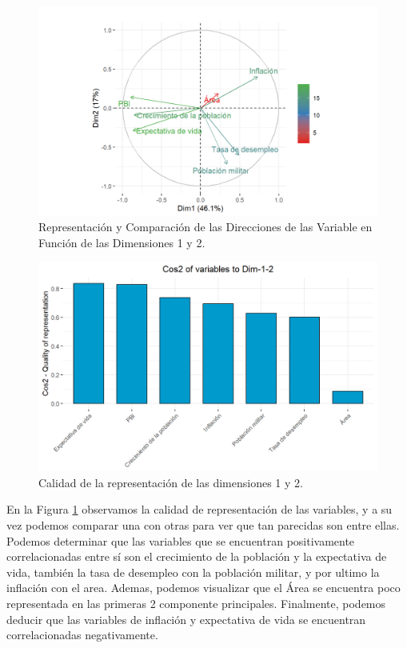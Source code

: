 \documentclass{article} %
\begin{document}
\begin{figure}[H]
	\centering
	\includegraphics[width=1\textwidth]{images/3-5-1}
	\caption{Representación y Comparación de las Direcciones de las Variable en Función de las Dimensiones 1 y 2.}
	\label{fig:falopa1}
\end{figure} 

\begin{figure}[H]
	\centering
	\includegraphics[width=1\textwidth]{images/3-5-2}
	\caption{Calidad de la representación de las dimensiones 1 y 2.}
	\label{fig:falopa2}
\end{figure} 

En la Figura \ref{fig:falopa1} observamos la calidad de representación de las variables, y a su vez podemos comparar una con otras para ver que tan parecidas son entre ellas. Podemos determinar que las variables que se encuentran positivamente correlacionadas entre sí son el crecimiento de la población y la expectativa de vida, también la tasa de desempleo con la población militar, y por ultimo la inflación con el area. Ademas, podemos visualizar que el Área se encuentra poco representada en las primeras 2 componente principales. Finalmente, podemos deducir que las variables de inflación y expectativa de vida se encuentran correlacionadas negativamente.
\end{document}
